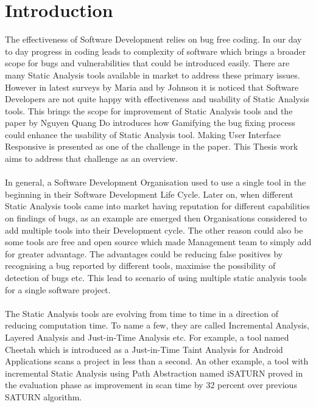 \chapter{Introduction}
\label{ch:introduction}

The effectiveness of Software Development relies on bug free coding. In our day to day progress in coding leads to complexity of software which brings a broader scope for bugs and vulnerabilities that could be introduced easily. There are many Static Analysis tools available in market to address these primary issues. However in latest surveys by Maria \etal{} \cite{CB16} and by Johnson \etal{} \cite{JSMB13} it is noticed that Software Developers are not quite happy with effectiveness and usability of Static Analysis tools. This brings the scope for improvement of Static Analysis tools and the paper by Nguyen Quang Do \etal{} \cite{NB18} introduces how Gamifying the bug fixing process could enhance the usability of Static Analysis tool. Making User Interface Responsive is presented as one of the challenge in the paper. This Thesis work aims to address that challenge as an overview. 
\\ \\

In general, a Software Development Organisation used to use a single tool in the beginning in their Software Development Life Cycle. Later on, when different Static Analysis tools came into market having reputation for different capabilities on findings of bugs, as an example are emerged then Organisations considered to add multiple tools into their Development cycle. The other reason could also be some tools are free and open source which made Management team to simply add for greater advantage. The advantages could be reducing false positives by recognising a bug reported by different tools, maximise the possibility of detection of bugs etc. This lead to scenario of using multiple static analysis tools for a single software project.
\\ \\

The Static Analysis tools are evolving from time to time in a direction of reducing computation time. To name a few, they are called Incremental Analysis, Layered Analysis and Just-in-Time Analysis etc. For example, a tool named Cheetah which is introduced as a Just-in-Time Taint Analysis for Android Applications scans a project in less than a second. An other example, a tool with incremental Static Analysis using Path Abstraction named iSATURN proved in the evaluation phase as improvement in scan time by 32 percent over previous SATURN algorithm. 
\\ \\

